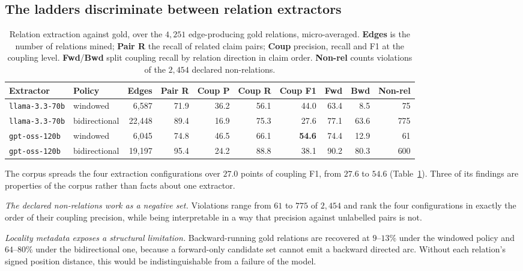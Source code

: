 \subsection{The ladders discriminate between relation extractors}
\label{sec-extract}

\begin{table}[t]
\centering\small
\caption{Relation extraction against gold, over the $4{,}251$ edge-producing gold relations, micro-averaged.
  \textbf{Edges} is the number of relations mined; \textbf{Pair R} the recall of related claim pairs; \textbf{Coup}
  precision, recall and F1 at the coupling level. \textbf{Fwd}/\textbf{Bwd} split coupling recall by relation
  direction in claim order. \textbf{Non-rel} counts violations of the $2{,}454$ declared non-relations.}
\label{tab:mining}
\setlength{\tabcolsep}{4.5pt}
\begin{tabular}{@{}llrrrrrrrr@{}}
\toprule
Extractor & Policy & Edges & Pair R & Coup P & Coup R & Coup F1 & Fwd & Bwd & Non-rel \\
\midrule
\texttt{llama-3.3-70b} & windowed      & 6{,}587  & 71.9 & 36.2 & 56.1 & 44.0 & 63.4 & 8.5  & 75 \\
\texttt{llama-3.3-70b} & bidirectional & 22{,}448 & 89.4 & 16.9 & 75.3 & 27.6 & 77.1 & 63.6 & 775 \\
\texttt{gpt-oss-120b}  & windowed      & 6{,}045  & 74.8 & 46.5 & 66.1 & \textbf{54.6} & 74.4 & 12.9 & 61 \\
\texttt{gpt-oss-120b}  & bidirectional & 19{,}197 & 95.4 & 24.2 & 88.8 & 38.1 & 90.2 & 80.3 & 600 \\
\bottomrule
\end{tabular}
\end{table}

The corpus spreads the four extraction configurations over $27.0$ points of coupling F1, from $27.6$ to $54.6$
(Table~\ref{tab:mining}). Three of its findings are properties of the corpus rather than facts about one extractor.

\emph{The declared non-relations work as a negative set.} Violations range from $61$ to $775$ of $2{,}454$ and
rank the four configurations in exactly the order of their coupling precision, while being interpretable in a way
that precision against unlabelled pairs is not.

\emph{Locality metadata exposes a structural limitation.} Backward-running gold relations are recovered at
$9$--$13\%$ under the windowed policy and $64$--$80\%$ under the bidirectional one, because a forward-only candidate
set cannot emit a backward directed arc. Without each relation's signed position distance, this would be
indistinguishable from a failure of the model.

